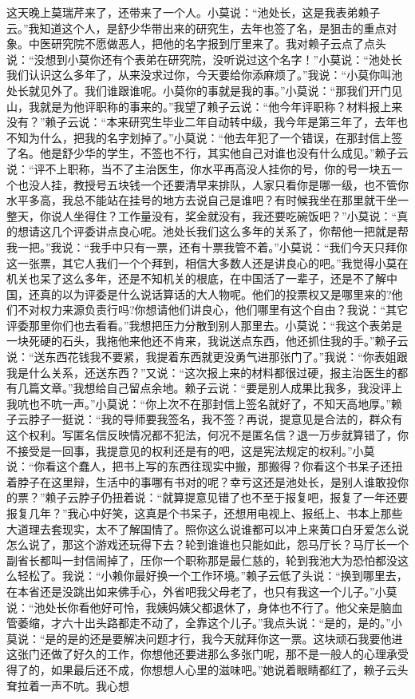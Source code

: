 \documentclass[12pt,oneside]{book}
\begin{document}
这天晚上莫瑞芹来了，还带来了一个人。小莫说：``池处长，这是我表弟赖子云。''我知道这个人，是舒少华带出来的研究生，去年也签了名，是狙击的重点对象。中医研究院不愿做恶人，把他的名字报到厅里来了。我对赖子云点了点头说：``没想到小莫你还有个表弟在研究院，没听说过这个名字！''小莫说：``池处长我们认识这么多年了，从来没求过你，今天要给你添麻烦了。''我说：``小莫你叫池处长就见外了。我们谁跟谁呢。小莫你的事就是我的事。''小莫说：``那我们开门见山，我就是为他评职称的事来的。''我望了赖子云说：``他今年评职称？材料报上来没有？''赖子云说：``本来研究生毕业二年自动转中级，我今年是第三年了，去年也不知为什么，把我的名字划掉了。''小莫说：``他去年犯了一个错误，在那封信上签了名。他是舒少华的学生，不签也不行，其实他自己对谁也没有什么成见。''赖子云说：``评不上职称，当不了主治医生，你水平再高没人挂你的号，你的号一块五一个也没人挂，教授号五块钱一个还要清早来排队，人家只看你是哪一级，也不管你水平多高，我总不能站在挂号的地方去说自己是谁吧？有时候我坐在那里就干坐一整天，你说人坐得住？工作量没有，奖金就没有，我还要吃碗饭吧？''小莫说：``真的想请这几个评委讲点良心呢。池处长我们这么多年的关系了，你帮他一把就是帮我一把。''我说：``我手中只有一票，还有十票我管不着。''小莫说：``我们今天只拜你这一张票，其它人我们一个个拜到，相信大多数人还是讲良心的吧。''我觉得小莫在机关也呆了这么多年，还是不知机关的根底，在中国活了一辈子，还是不了解中国，还真的以为评委是什么说话算话的大人物呢。他们的投票权又是哪里来的?他们不对权力来源负责行吗?你想请他们讲良心，他们哪里有这个自由？我说：``其它评委那里你们也去看看。''我想把压力分散到别人那里去。小莫说：``我这个表弟是一块死硬的石头，我拖他来他还不肯来，我说送点东西，他还抓住我的手。''赖子云说：``送东西花钱我不要紧，我提着东西就更没勇气进那张门了。''我说：``你表姐跟我是什么关系，还送东西？''又说：``这次报上来的材料都很过硬，报主治医生的都有几篇文章。''我想给自己留点余地。赖子云说：``要是别人成果比我多，我没评上我吭也不吭一声。''小莫说：``你上次不在那封信上签名就好了，不知天高地厚。''赖子云脖子一挺说：``我的导师要我签名，我不签？再说，提意见是合法的，群众有这个权利。写匿名信反映情况都不犯法，何况不是匿名信？退一万步就算错了，你不接受是一回事，我提意见的权利还是有的吧，这是宪法规定的权利。''小莫说：``你看这个蠢人，把书上写的东西往现实中搬，那搬得？你看这个书呆子还扭着脖子在这里辩，生活中的事哪有书对的呢？幸亏这还是池处长，是别人谁敢投你的票？''赖子云脖子仍扭着说：``就算提意见错了也不至于报复吧，报复了一年还要报复几年？''我心中好笑，这真是个书呆子，还想用电视上、报纸上、书本上那些大道理去套现实，太不了解国情了。照你这么说谁都可以冲上来黄口白牙爱怎么说怎么说了，那这个游戏还玩得下去？轮到谁谁也只能如此，怨马厅长？马厅长一个副省长都叫一封信闹掉了，压你一个职称那是最仁慈的，轮到我池大为恐怕都没这么轻松了。我说：``小赖你最好换一个工作环境。''赖子云低了头说：``换到哪里去，在本省还是没跳出如来佛手心，外省吧我父母老了，也只有我这一个儿子。''小莫说：``池处长你看他好可怜，我姨妈姨父都退休了，身体也不行了。他父亲是脑血管萎缩，才六十出头路都走不动了，全靠这个儿子。''我点头说：``是的，是的。''小莫说：``是的是的还是要解决问题才行，我今天就拜你这一票。这块顽石我要他进这张门还做了好久的工作，你想他还要进那么多张门呢，那不是一般人的心理承受得了的，如果最后还不成，你想想人心里的滋味吧。''她说着眼睛都红了，赖子云头耷拉着一声不吭。我心想
\end{document}
